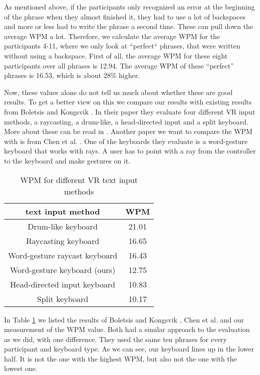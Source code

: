 As mentioned above, if the participants only recognized an error at the beginning of the phrase when they almost finished it, they had to use a lot of backspaces and more or less had to write the phrase a second time. These can pull down the average WPM a lot. Therefore, we calculate the average WPM for the participants 4-11, where we only look at ``perfect`` phrases, that were written without using a backspace. First of all, the average WPM for these eight participants over all phrases is 12.94. The average WPM of these ``perfect'' phrases is 16.53, which is about 28\% higher.

Now, these values alone do not tell us much about whether these are good results. To get a better view on this we compare our results with existing results from Boletsis and Kongsvik \cite{Boletsis2019ControllerbasedTT}. In their paper they evaluate four different VR input methods, a raycasting, a drum-like, a head-directed input and a split keyboard. More about these can be read in . Another paper we want to compare the WPM with is from Chen et al. \cite{10.1145/3290607.3312762}. One of the keyboards they evaluate is a word-gesture keyboard that works with rays. A user has to point with a ray from the controller to the keyboard and make gestures on it.
\begin{table}[ht!]
    \centering
    \caption{WPM for different VR text input methods}
    \begin{tabular}{cc} \toprule
        text input method&WPM\\ \midrule
        Drum-like keyboard& 21.01\\
        Raycasting keyboard& 16.65\\
        Word-gesture raycast keyboard& 16.43\\
        Word-gesture keyboard (ours)& 12.75\\
        Head-directed input keyboard& 10.83\\
        Split keyboard& 10.17\\
        \bottomrule
    \end{tabular}
    \label{tab:wpm_compare}
\end{table}

In Table \ref{tab:wpm_compare} we listed the results of Boletsis and Kongsvik \cite{Boletsis2019ControllerbasedTT}, Chen et al. \cite{10.1145/3290607.3312762} and our measurement of the WPM value. Both had a similar approach to the evaluation as we did, with one difference. They used the same ten phrases for every participant and keyboard type. As we can see, our keyboard lines up in the lower half. It is not the one with the highest WPM, but also not the one with the lowest one.\\

